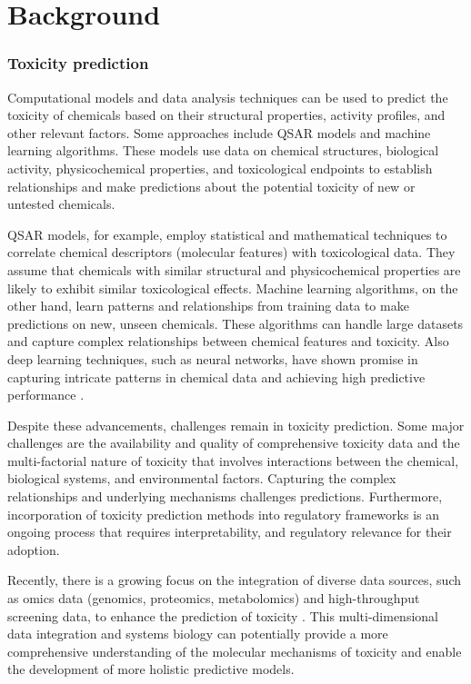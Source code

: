 \chapter{Background}

\subsection*{Toxicity prediction}

Computational models and data analysis techniques can be used to predict the toxicity of chemicals based on their structural properties, activity profiles, and other relevant factors. Some approaches include \ac{QSAR} models and machine learning algorithms. These models use data on chemical structures, biological activity, physicochemical properties, and toxicological endpoints to establish relationships and make predictions about the potential toxicity of new or untested chemicals.

QSAR models, for example, employ statistical and mathematical techniques to correlate chemical descriptors (molecular features) with toxicological data. They assume that chemicals with similar structural and physicochemical properties are likely to exhibit similar toxicological effects. Machine learning algorithms, on the other hand, learn patterns and relationships from training data to make predictions on new, unseen chemicals. These algorithms can handle large datasets and capture complex relationships between chemical features and toxicity. Also deep learning techniques, such as neural networks, have shown promise in capturing intricate patterns in chemical data and achieving high predictive performance \cite{unterthiner2015toxicity}\cite{mayr_deeptox_2016}.

Despite these advancements, challenges remain in toxicity prediction. Some major challenges are the availability and quality of comprehensive toxicity data \cite{Idakwo2018} and the multi-factorial nature of toxicity that involves interactions between the chemical, biological systems, and environmental factors. Capturing the complex relationships and underlying mechanisms challenges predictions. Furthermore, incorporation of toxicity prediction methods into regulatory frameworks is an ongoing process \cite{Paini2019}\cite{Ciallella2019} that requires interpretability, and regulatory relevance for their adoption.

Recently, there is a growing focus on the integration of diverse data sources, such as omics data (genomics, proteomics, metabolomics) and high-throughput screening data, to enhance the prediction of toxicity \cite{Zhu_2016}. This multi-dimensional data integration and systems biology can potentially provide a more comprehensive understanding of the molecular mechanisms of toxicity and enable the development of more holistic predictive models.


